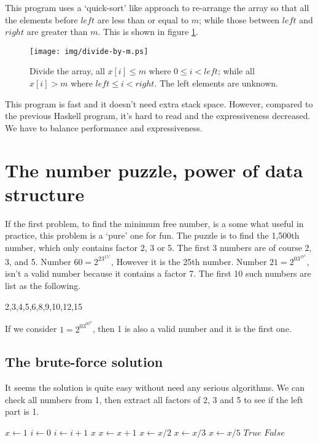 \documentclass{article}
\begin{document}
This program uses a `quick-sort' like approach to re-arrange the
array so that all the elements before $left$ are less than or equal
to $m$; while those between $left$ and $right$ are greater
than $m$. This is shown in figure \ref{fig:divide}.

\begin{figure}[htbp]
  \centering
  \texttt{[image: img/divide-by-m.ps]}
  \caption{Divide the array, all $x[i] \leq m$ where $0 \leq i < left$; while all $x[i] > m$ where $left \leq i < right$. The left elements are unknown.} \label{fig:divide}
\end{figure}

This program is fast and it doesn't need extra stack space. However,
compared to the previous Haskell program, it's hard to read and the
expressiveness decreased. We have to balance performance
and expressiveness.

\section{The number puzzle, power of data structure}

If the first problem, to find the minimum free number, is a some what
useful in practice, this problem is a `pure' one for fun. The puzzle
is to find the 1,500th number, which only contains factor 2, 3 or 5.
The first 3 numbers are of course 2, 3, and 5. Number $60 = 2^23^15^1$,
However it is the 25th number. Number $21 = 2^03^17^1$, isn't a valid
number because it contains a factor 7. The first 10 such numbers are list
as the following.

2,3,4,5,6,8,9,10,12,15

If we consider $1=2^03^05^0$, then 1 is also a valid number and it is
the first one.

\subsection{The brute-force solution}
It seems the solution is quite easy without need any serious algorithms.
We can check all numbers from 1, then extract all factors of 2, 3 and 5
to see if the left part is 1.

\begin{algorithmic}[1]
  \State $x \gets 1$
  \State $i \gets 0$
  \Loop
      \State $i \gets i + 1$
        \State \Return $x$
      \EndIf
    \EndIf
    \State $x \gets x + 1$
  \EndLoop
\EndFunction
\Statex
{}
    \State $x \gets x / 2$
  \EndWhile
    \State $x \gets x / 3$
  \EndWhile
    \State $x \gets x / 5$
  \EndWhile
    \State \Return $True$
  \Else
    \State \Return $False$
  \EndIf
\EndFunction
\end{algorithmic}
\end{document}
